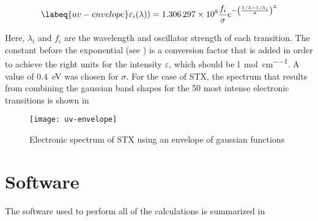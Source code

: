 \begin{equation}
    \labeq{uv-envelope}
    \varepsilon_i (\lambda)) = \num{1.306297e8} \frac{f_i}{\sigma} e^{-\left(\frac{1/\lambda - 1/\lambda_i}{\sigma}\right)^2}
\end{equation}

Here, $\lambda_i$ and $f_i$ are the wavelength and oscillator strength of each transition. The constant before the exponential (see ) is a conversion factor that is added in order to achieve the right units for the intensity $\varepsilon$, which should be \si{\litre\per\mole\per\cm}.
A value of \SI{0.4}{\eV} was chosen for $\sigma$.
For the case of STX, the spectrum that results from combining the gaussian band shapes for the 50 most intense electronic transitions is shown in 

\begin{figure}
    \centering
    \texttt{[image: uv-envelope]}
    \caption[Electronic spectrum with gaussian envelopes]{Electronic spectrum of STX using an envelope of gaussian functions}
\end{figure}


\section{Software}

The software used to perform all of the calculations is summarized in 

